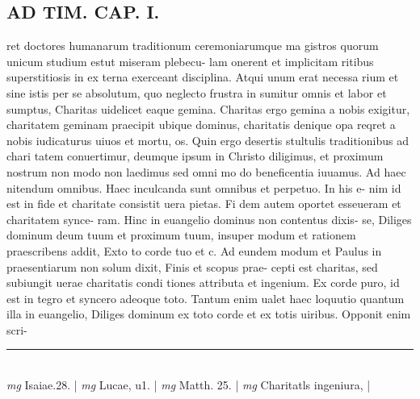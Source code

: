 \documentclass{article}
\begin{document}
\begin{pages}
\section*{AD TIM. CAP. I. }
\marginpar{[ p.98 ]}\pstart ret doctores humanarum traditionum ceremoniarumque ma gistros quorum unicum studium estut miseram plebecu- lam onerent et implicitam ritibus superstitiosis in ex terna exerceant disciplina. Atqui unum erat necessa rium et sine istis per se absolutum, quo neglecto frustra in sumitur omnis et labor et sumptus, Charitas uidelicet eaque gemina. Charitas ergo gemina a nobis exigitur, charitatem geminam praecipit ubique dominus, charitatis denique opa reqret a nobis iudicaturus uiuos et mortu, os. Quin ergo desertis stultulis traditionibus ad chari tatem conuertimur, deumque ipsum in Christo diligimus, et proximum nostrum non modo non laedimus sed omni mo do beneficentia iuuamus. Ad haec nitendum omnibus. Haec inculcanda sunt omnibus et perpetuo. In his e- nim id est in fide et charitate consistit uera pietas. Fi dem autem oportet esseueram et charitatem synce- ram. Hinc in euangelio dominus non contentus dixis- se, Diliges dominum deum tuum et proximum tuum, insuper modum et rationem praescribens addit, Exto to corde tuo et c. Ad eundem modum et Paulus in praesentiarum non solum dixit, Finis et scopus prae- cepti est charitas, sed subiungit uerae charitatis condi tiones attributa et ingenium. Ex corde puro, id est in tegro et syncero adeoque toto. Tantum enim ualet haec loquutio quantum illa in euangelio, Diliges dominum ex toto corde et ex totis uiribus. Opponit enim scri-  \pend
\vspace{0.5cm}\noindent
\vspace{0.2cm}\rule{1cm}{0.2pt}\\ 
\hspace{0.2cm}\textit{mg}
\footnotesize Isaiae.28. 
\normalsize| 
\hspace{0.2cm}\textit{mg}
\footnotesize Lucae, u1. 
\normalsize| 
\hspace{0.2cm}\textit{mg}
\footnotesize Matth. 25. 
\normalsize| 
\hspace{0.2cm}\textit{mg}
\footnotesize Charitatls ingeniura, 
\normalsize| 

\end{pages}
\end{document}

